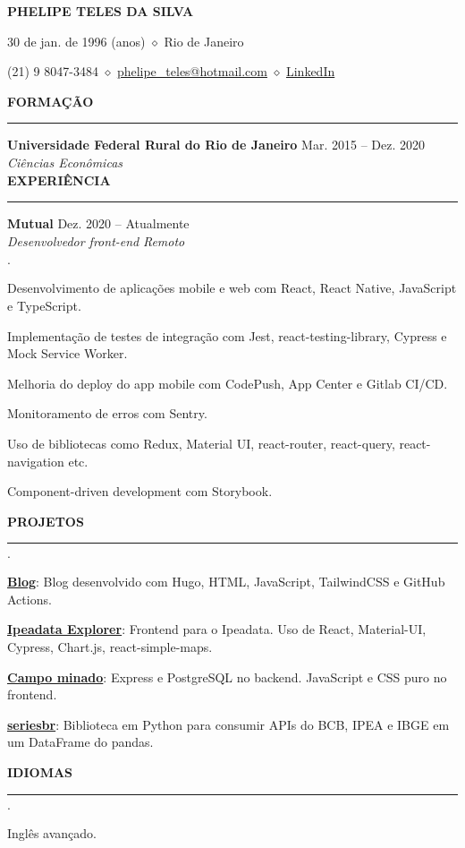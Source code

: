 \documentclass[11pt,letterpaper]{article}
\begin{document}
\centerline{\MakeUppercase{\huge\bf Phelipe Teles da Silva}}
\medskip

\centerline{30 de jan. de 1996 (anos) $\diamond$ Rio de Janeiro}
\smallskip

\centerline{
  (21) 9 8047-3484 $\diamond$
  \href{mailto:phelipe_teles@hotmail.com}{phelipe\_teles@hotmail.com} $\diamond$ \href{https://linkedin.com/in/phelipeteles}{LinkedIn}
}
\smallskip

\medskip \textbf{FORMAÇÃO} \medskip
\hrule

\textbf{Universidade Federal Rural do Rio de Janeiro} \hfill {Mar. 2015 -- Dez. 2020} \\
\emph{Ciências Econômicas} \hfill \\

\medskip \textbf{EXPERIÊNCIA} \medskip
\hrule

\textbf{Mutual} \hfill Dez. 2020 -- Atualmente \\
\emph{Desenvolvedor front-end} \hfill \emph{Remoto} \\

\vspace*{-\baselineskip}

\begin{list}
{$\cdot$}
{
\setlength{\leftmargin}{0em}
\setlength{\itemsep}{-0.5em}
}
  \item Desenvolvimento de aplicações mobile e web com React, React Native,
    JavaScript e TypeScript.
  \item Implementação de testes de integração com Jest, react-testing-library,
    Cypress e Mock Service Worker.
  \item Melhoria do deploy do app mobile com CodePush, App Center e Gitlab CI/CD.
  \item Monitoramento de erros com Sentry.
  \item Uso de bibliotecas como Redux, Material UI, react-router, react-query,
    react-navigation etc.
  \item Component-driven development com Storybook.
\end{list}

\medskip \textbf{PROJETOS} \medskip
\hrule

\begin{list}
{$\cdot$}
{
\setlength{\leftmargin}{0em}
\setlength{\itemsep}{-0.5em}
}
 \item \href{https://phelipetls.github.io}{\textbf{Blog}}: Blog desenvolvido com
   Hugo, HTML, JavaScript, TailwindCSS e GitHub Actions.
 \item \href{http://ipeadata-explorer.surge.sh}{\textbf{Ipeadata Explorer}}:
   Frontend para o Ipeadata. Uso de React, Material-UI, Cypress, Chart.js,
   react-simple-maps.
 \item \href{https://github.com/phelipetls/minesweeper.js}{\textbf{Campo minado}}:
   Express e PostgreSQL no backend. JavaScript e CSS puro no frontend.
 \item \href{https://github.com/phelipetls/seriesbr}{\textbf{seriesbr}}:
   Biblioteca em Python para consumir APIs do BCB, IPEA e IBGE em um DataFrame
   do pandas.
\end{list}

\medskip \textbf{IDIOMAS} \medskip
\hrule

\begin{list}
{$\cdot$}
{
\setlength{\leftmargin}{0em}
\setlength{\itemsep}{-0.5em}
}
  \item Inglês avançado.
\end{list}
\end{document}
